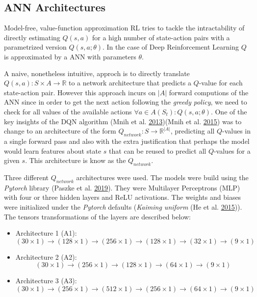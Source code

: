 \documentclass[
  openany]{book}
\providecommand{\tightlist}{%
  \setlength{\itemsep}{0pt}\setlength{\parskip}{0pt}}
\begin{document}
\hypertarget{ann-architectures}{%
\subsection{ANN Architectures}\label{ann-architectures}}

Model-free, value-function approximation RL tries to tackle the intractability of directly estimating \(Q(s,a)\) for a high number of state-action pairs with a parametrized version \(Q(s,a;\theta)\). In the case of Deep Reinforcement Learning \(Q\) is approximated by a ANN with parameters \(\theta\).

A naive, nonetheless intuitive, approch is to directly translate \(Q(s,a): S \times A \to \mathds{R}\) to a network architecture that predicts a \(Q\)-value for each state-action pair. However this approach incurs on \(|A|\) forward computions of the ANN since in order to get the next action following the \emph{greedy policy}, we need to check for all values of the available actions \(\forall a \in A(S_t): Q(s,a;\theta)\). One of the key insights of the DQN algorithm (Mnih et al. \protect\hyperlink{ref-mnih2013playing}{2013})(Mnih et al. \protect\hyperlink{ref-mnih2015human}{2015}) was to change to an architecture of the form \(Q_{network}: S \to \mathds{R}^{|A|}\), predicting all \(Q\)-values in a single forward pass and also with the extra justification that perhaps the model would learn features about state \(s\) that can be reused to predict all \(Q\)-values for a given \(s\). This architecture is know as the \(Q_{network}\).

Three different \(Q_{network}\) architectures were used. The models were build using the \emph{Pytorch} library (Paszke et al. \protect\hyperlink{ref-NEURIPS2019_9015}{2019}). They were Multilayer Perceptrons (MLP) with four or three hidden layers and ReLU activations. The weights and biases were initialized under the \emph{Pytorch} defaults (\emph{Kaiming uniform} (He et al. \protect\hyperlink{ref-he2015delving}{2015})). The tensors transformations of the layers are described below:

\begin{itemize}
\tightlist
\item
  Architecture 1 (A1):
  \[(30 \times 1) \to (128 \times 1) \to (256 \times 1) \to (128 \times 1) \to (32 \times 1) \to (9 \times 1)\]
\item
  Architecture 2 (A2):
  \[(30 \times 1) \to (256 \times 1) \to (128 \times 1) \to (64 \times 1) \to (9 \times 1)\]
\item
  Architecture 3 (A3):
  \[(30 \times 1) \to (256 \times 1) \to (512 \times 1) \to (256 \times 1) \to (64 \times 1) \to (9 \times 1)\]
\end{itemize}
\end{document}
